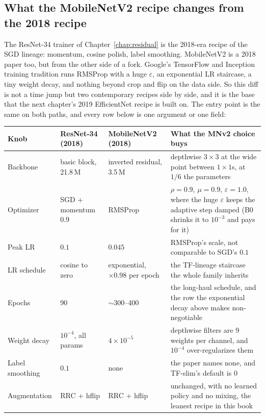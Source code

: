 \subsection*{What the MobileNetV2 recipe changes from the 2018 recipe}

The ResNet-34 trainer of Chapter~\ref{chap:residual} is the
2018-era recipe of the SGD lineage: momentum, cosine polish,
label smoothing. MobileNetV2 is a 2018 paper too, but from the other
side of a fork. Google's TensorFlow and Inception training tradition
runs RMSProp with a huge $\varepsilon$, an exponential LR staircase, a
tiny weight decay, and nothing beyond crop and flip on the data
side. So this diff is not a time jump but two contemporary recipes
side by side, and it is the base that the next chapter's 2019
EfficientNet recipe is built on. The entry point is the same on both
paths, and every row below is one argument or one field:

\begin{center}
\begin{tabular}{@{}l p{2.9cm} p{3.2cm} p{6.3cm}@{}}
\hline
Knob & ResNet-34 (2018) & MobileNetV2 (2018) & What the MNv2 choice buys \\
\hline
Backbone      & basic block, 21.8\,M   & inverted residual, 3.5\,M     & depthwise $3\times3$ at the wide point between $1\times1$s, at $1/6$ the parameters \\
Optimizer     & SGD + momentum $0.9$   & RMSProp                       & $\rho{=}0.9$, $\mu{=}0.9$, $\varepsilon{=}1.0$, where the huge $\varepsilon$ keeps the adaptive step damped (B0 shrinks it to $10^{-3}$ and pays for it) \\
Peak LR       & $0.1$                  & $0.045$                       & RMSProp's scale, not comparable to SGD's $0.1$ \\
LR schedule   & cosine to zero         & exponential, $\times0.98$ per epoch & the TF-lineage staircase the whole family inherits \\
Epochs        & 90                     & $\sim$300--400                & the long-haul schedule, and the row the exponential decay above makes non-negotiable \\
Weight decay  & $10^{-4}$, all params  & $4\times10^{-5}$              & depthwise filters are 9 weights per channel, and $10^{-4}$ over-regularizes them \\
Label smoothing & $0.1$                & none                          & the paper names none, and TF-slim's default is $0$ \\
Augmentation  & RRC + hflip            & RRC + hflip                   & unchanged, with no learned policy and no mixing, the leanest recipe in this book \\
\hline
\end{tabular}
\end{center}

